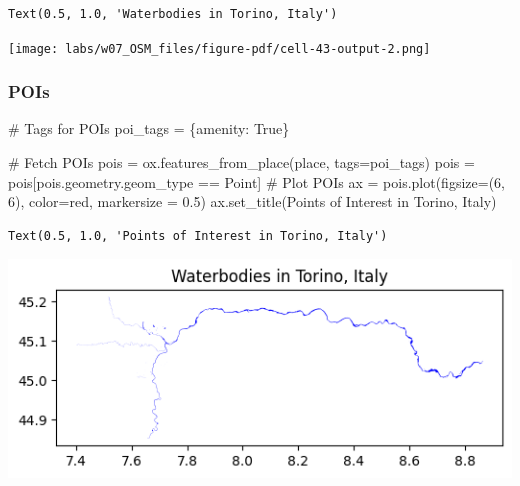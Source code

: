 \documentclass[
  letterpaper,
  DIV=11,
  numbers=noendperiod]{scrreprt}
\newenvironment{Shaded}{\begin{snugshade}}{\end{snugshade}}
\newcommand{\CommentTok}[1]{\textcolor[rgb]{0.37,0.37,0.37}{#1}}
\newcommand{\DecValTok}[1]{\textcolor[rgb]{0.68,0.00,0.00}{#1}}
\newcommand{\FloatTok}[1]{\textcolor[rgb]{0.68,0.00,0.00}{#1}}
\newcommand{\NormalTok}[1]{\textcolor[rgb]{0.00,0.23,0.31}{#1}}
\newcommand{\OperatorTok}[1]{\textcolor[rgb]{0.37,0.37,0.37}{#1}}
\newcommand{\StringTok}[1]{\textcolor[rgb]{0.13,0.47,0.30}{#1}}
\newcommand{\VariableTok}[1]{\textcolor[rgb]{0.07,0.07,0.07}{#1}}
\begin{document}
\begin{verbatim}
Text(0.5, 1.0, 'Waterbodies in Torino, Italy')
\end{verbatim}

\texttt{[image: labs/w07\_OSM\_files/figure-pdf/cell-43-output-2.png]}

\subsubsection{POIs}\label{pois}

\begin{Shaded}
\begin{Highlighting}[]
\CommentTok{\# Tags for POIs}
\NormalTok{poi\_tags }\OperatorTok{=}\NormalTok{ \{}\StringTok{\textquotesingle{}amenity\textquotesingle{}}\NormalTok{: }\VariableTok{True}\NormalTok{\}}

\CommentTok{\# Fetch POIs}
\NormalTok{pois }\OperatorTok{=}\NormalTok{ ox.features\_from\_place(place, tags}\OperatorTok{=}\NormalTok{poi\_tags)}
\NormalTok{pois }\OperatorTok{=}\NormalTok{ pois[pois.geometry.geom\_type }\OperatorTok{==} \StringTok{\textquotesingle{}Point\textquotesingle{}}\NormalTok{]}
\CommentTok{\# Plot POIs}
\NormalTok{ax }\OperatorTok{=}\NormalTok{ pois.plot(figsize}\OperatorTok{=}\NormalTok{(}\DecValTok{6}\NormalTok{, }\DecValTok{6}\NormalTok{), color}\OperatorTok{=}\StringTok{\textquotesingle{}red\textquotesingle{}}\NormalTok{, markersize }\OperatorTok{=} \FloatTok{0.5}\NormalTok{)}
\NormalTok{ax.set\_title(}\StringTok{\textquotesingle{}Points of Interest in Torino, Italy\textquotesingle{}}\NormalTok{)}
\end{Highlighting}
\end{Shaded}

\begin{verbatim}
Text(0.5, 1.0, 'Points of Interest in Torino, Italy')
\end{verbatim}

\includegraphics{labs/w07_OSM_files/figure-pdf/cell-44-output-2.png}
\end{document}

